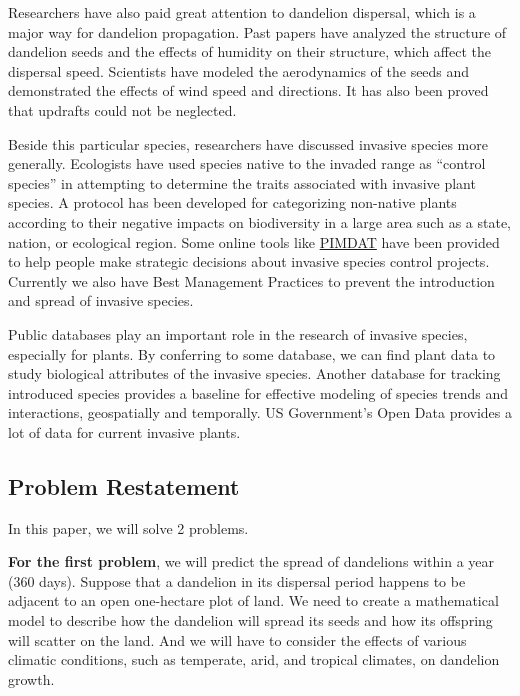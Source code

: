 \documentclass[12pt]{article}
\begin{document}
	Researchers have also paid great attention to dandelion dispersal, which is a major way for dandelion propagation.  Past papers have analyzed the structure of dandelion seeds and the effects of humidity on their structure, which affect the dispersal speed\autocite{greene1989model}. Scientists have modeled the aerodynamics of the seeds and demonstrated the effects of wind speed and directions.  It has also been proved that updrafts could not be neglected\autocite{tackenberg2003dandelion}.
	
	Beside this particular species, researchers have discussed invasive species more generally.  Ecologists have used species native to the invaded range as ``control species'' in attempting to determine the traits associated with invasive plant species\autocite{muth2006traits}.  A protocol has been developed for categorizing non-native plants according to their negative impacts on biodiversity in a large area such as a state, nation, or ecological region\autocite{randall2008invasive}.  Some online tools like \href{https://www.imapinvasives.org/decision-analysis-tool}{PIMDAT}\autocite{PIMDAT} have been provided to help people make strategic decisions about invasive species control projects.  Currently we also have Best Management Practices to prevent the introduction and spread of invasive species\autocite{BMP}.
	
	Public databases play an important role in the research of invasive species, especially for plants. By conferring to some database, we can find plant data to study biological attributes of the invasive species\autocite{USDA}.  Another database for tracking introduced species provides a baseline for effective modeling of species trends and interactions, geospatially and temporally\autocite{US-RIIS}.  US Government's Open Data provides a lot of data for current invasive plants\autocite{DATAGOV}.
	\newpage
	
	\subsection{Problem Restatement}

	In this paper, we will solve 2 problems.
	
	\textbf{For the first problem}, we will predict the spread of dandelions within a year (360 days).  Suppose that a dandelion in its dispersal period happens to be adjacent to an open one-hectare plot of land.  We need to create a mathematical model to describe how the dandelion will spread its seeds and how its offspring will scatter on the land.  And we will have to consider the effects of various climatic conditions, such as temperate, arid, and tropical climates, on dandelion growth.
	
\end{document}
